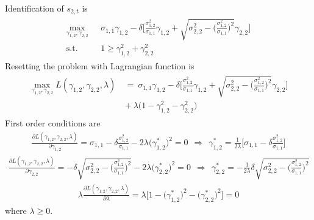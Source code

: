 \documentclass[14pt]{article}
\begin{document}
{Identification of $s_{2,t}$ is
\begin{eqnarray}\label{eq:problem_Gam2}
\begin{aligned}
\max_{\gamma_{1,2},\gamma_{2,2}} \ \ & \ \sigma_{1,1} \gamma_{1,2} - \delta \Bigg[ \frac{\sigma_{1,2}^2}{\sigma_{1,1}}  \gamma_{1,2} + \sqrt{\sigma_{2,2}^2 - \Big( \frac{\sigma_{1,2}^2}{\sigma_{1,1}} \Big)^2} \gamma_{2,2}   \Bigg] \\
\text{s.t.} \ \ & \ 1 \geq \gamma_{1,2}^2 + \gamma_{2,2}^2
\end{aligned}
\end{eqnarray}
Resetting the problem with Lagrangian function is
\begin{eqnarray}\label{eq:lagrangian2}
\begin{aligned}
\max_{\gamma_{1,2},\gamma_{2,2}} L(\gamma_{1,2},\gamma_{2,2},\lambda) \ &= \  \sigma_{1,1} \gamma_{1,2} - \delta \Bigg[ \frac{\sigma_{1,2}^2}{\sigma_{1,1}}  \gamma_{1,2} + \sqrt{\sigma_{2,2}^2 - \Big( \frac{\sigma_{1,2}^2}{\sigma_{1,1}} \Big)^2} \gamma_{2,2}   \Bigg] \\
\ &+ \ \lambda \big(1 - \gamma_{1,2}^2 - \gamma_{2,2}^2 \big)
\end{aligned}
\end{eqnarray}
First order conditions are
\begin{eqnarray}\label{eq:foc_gam12}
\frac{\partial L(\gamma_{1,2},\gamma_{2,2},\lambda) }{\partial \gamma_{1,2}} = \sigma_{1,1} - \delta\frac{\sigma_{1,2}^2}{\sigma_{1,1}} - 2 \lambda \big( \gamma_{1,2}^* \big)^2 = 0 \ \ \Rightarrow \ \ \gamma_{1,2}^* = \frac{1}{2 \lambda} \bigg[ \sigma_{1,1} -  \delta\frac{\sigma_{1,2}^2}{\sigma_{1,1}}  \bigg]
\end{eqnarray}
\begin{eqnarray}\label{eq:foc_gam22}
\frac{\partial L(\gamma_{1,2},\gamma_{2,2},\lambda) }{\partial \gamma_{2,2}} =  - \delta \sqrt{\sigma_{2,2}^2 - \Big( \frac{\sigma_{1,2}^2}{\sigma_{1,1}} \Big)^2} - 2 \lambda \big( \gamma_{2,2}^* \big)^2 = 0 \ \ \Rightarrow \ \ \gamma_{2,2}^* = -  \frac{1}{2 \lambda} \delta \sqrt{\sigma_{2,2}^2 - \Big( \frac{\sigma_{1,2}^2}{\sigma_{1,1}} \Big)^2}
\end{eqnarray}
\begin{eqnarray}\label{eq:complslackness2}
\lambda \frac{\partial L(\gamma_{1,2},\gamma_{2,2},\lambda) }{\partial \lambda} = \lambda\big[ 1 - \big( \gamma_{1,2}^* \big)^2 - \big( \gamma_{2,2}^* \big)^2 \big] = 0
\end{eqnarray}
where $\lambda \geq 0$.

\

}
\end{document}
